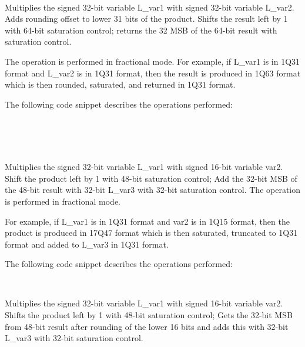 \\


Multiplies the signed 32-bit variable L\_var1 with signed 32-bit variable L\_var2.
Adds rounding offset to lower 31 bits of the product.
Shifts the result left by 1 with 64-bit saturation control; returns the 32 MSB of the 64-bit result with saturation control.

The operation is performed in fractional mode.
For example, if L\_var1 is in 1Q31 format and L\_var2 is in 1Q31 format, then the result is produced in 1Q63 format which is then rounded, saturated, and returned in 1Q31 format.

The following code snippet describes the operations performed:

\\
\\
\\


Multiplies the signed 32-bit variable L\_var1 with signed 16-bit variable var2.
Shift the product left by 1 with 48-bit saturation control; Add the 32-bit MSB of the 48-bit result with 32-bit L\_var3 with 32-bit saturation control.
The operation is performed in fractional mode.

For example, if L\_var1 is in 1Q31 format and var2 is in 1Q15 format, then the product is produced in 17Q47 format which is then saturated, truncated to 1Q31 format and added to L\_var3 in 1Q31 format.

The following code snippet describes the operations performed:

\\


Multiplies the signed 32-bit variable L\_var1 with signed 16-bit variable var2.
Shifts the product left by 1 with 48-bit saturation control;
Gets the 32-bit MSB from 48-bit result after rounding of the lower 16 bits and adds this with 32-bit L\_var3 with 32-bit saturation control.

